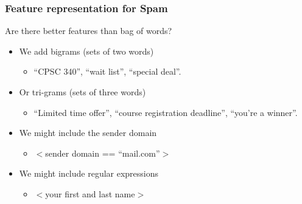 \documentclass{article}
\theoremstyle{definition}
\begin{document}
\subsubsection*{Feature representation for Spam}
Are there better features than bag of words?
\begin{itemize}[label=-]
	\item We add {\color{blue} bigrams} (sets of two words)
	\begin{itemize}
		\item “CPSC 340”, “wait list”, “special deal”.
	\end{itemize}
	\item Or {\color{blue} tri-grams} (sets of three words)
	\begin{itemize}
		\item “Limited time offer”, “course registration deadline”, “you’re a winner”.
	\end{itemize}
	\item We might include the sender domain
	\begin{itemize}
		\item $ < $sender domain == “mail.com”$ > $
	\end{itemize}
	\item We might include regular expressions
	\begin{itemize}
		\item $ < $your first and last name$ > $
	\end{itemize}
\end{itemize}
\end{document}

